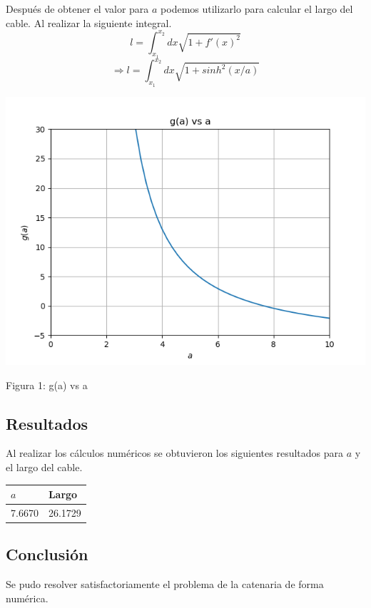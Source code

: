 \documentclass[letterpaper,11pt]{article} %
\begin{document}
Después de obtener el valor para $a$ podemos utilizarlo para calcular el largo del cable. Al realizar la siguiente integral.
$$ l = \int_{x_1}^{x_2}dx\sqrt{1 + f'(x)^2} $$
$$\Rightarrow l = \int_{x_1}^{x_2}dx\sqrt{1 + sinh^2(x/a)}$$
\begin{center} 

 \includegraphics[scale=0.65]{img/1.png}
 
 Figura 1: g(a) vs a
 
\end{center}


\subsection{Resultados}

Al realizar los cálculos numéricos se obtuvieron los siguientes resultados para $a$ y el largo del cable.

\begin{table}
\centering
\begin{tabular}{|l|l|}
\hline
$a$    & Largo   \\ \hline
7.6670 & 26.1729 \\ \hline
\end{tabular}
\end{table}


\subsection{Conclusión}
Se pudo resolver satisfactoriamente el problema de la catenaria de forma numérica.
\end{document}
